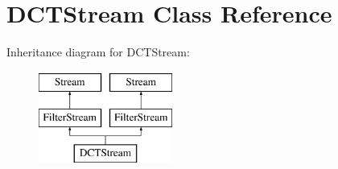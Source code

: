 \hypertarget{class_d_c_t_stream}{}\section{D\+C\+T\+Stream Class Reference}
\label{class_d_c_t_stream}
Inheritance diagram for D\+C\+T\+Stream\+:\begin{figure}[H]
\begin{center}
\leavevmode
\includegraphics[height=3.000000cm]{class_d_c_t_stream}
\end{center}
\end{figure}
